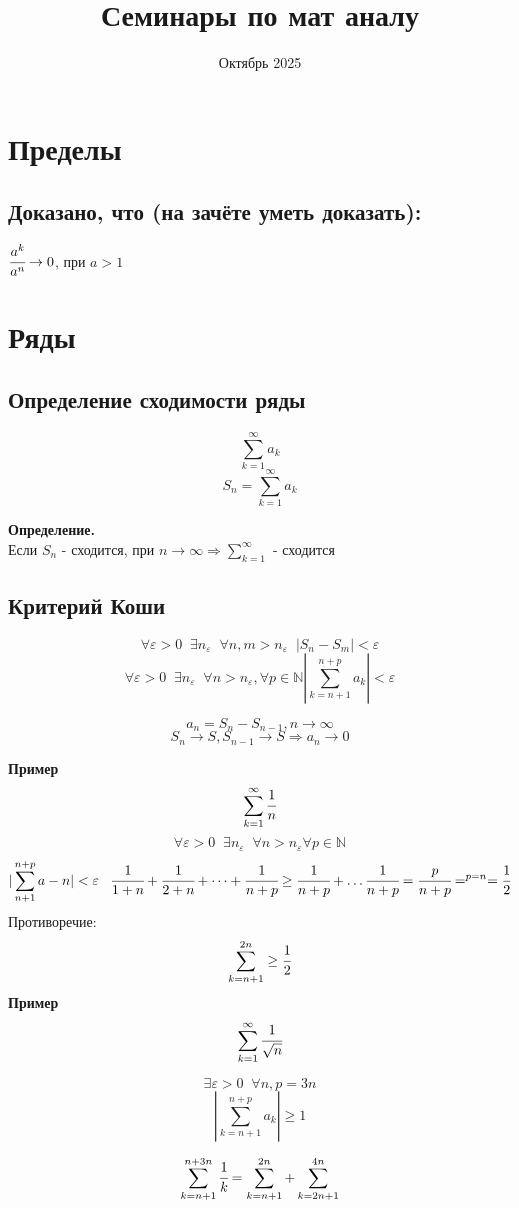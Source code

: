 \documentclass[12pt, paper]{article}
\title{Семинары по мат аналу}
\date{Октябрь 2025}
\newcommand{\N}{\mathbb{N}}
\begin{document}
\maketitle
\newpage
\section{Пределы}
\subsection{Доказано, что (на зачёте уметь доказать):}
$ \cfrac{a^k}{a^n} \to 0$, при $a > 1$
\section{Ряды}
\subsection{Определение сходимости ряды}
\[ \sum_{k=1}^\infty a_k\]
\[ S_n = \sum_{k=1}^\infty a_k\]

\begin{tcolorbox}
\textbf{Определение.} \\
Если $S_n$ - сходится, при $n \to \infty \Rightarrow  \sum_{k=1}^\infty $ - сходится 
\end{tcolorbox}

\subsection{Критерий Коши}
\begin{tcolorbox}
    \[ \forall \varepsilon > 0\;\; \exists n_\varepsilon\;\; \forall n,m > n_\varepsilon \;\; |S_n-S_m| < \varepsilon\]
    \[ \forall \varepsilon > 0\;\; \exists n_\varepsilon\;\; \forall n > n_\varepsilon,\forall p \in \N |\sum_{k=n+1}^{n+p} a_k|< \varepsilon \]    
\end{tcolorbox}


\[a_n = S_n - S_{n-1}, n\to \infty\]
\[ S_n \to S, S_{n-1} \to S \Rightarrow a_n \to 0\]

\textbf{Пример} 
\[\sum_{k=1}^\infty  \cfrac{1}{n}\]
\[ \forall \varepsilon > 0\;\; \exists n_\varepsilon\;\; \forall n > n_\varepsilon \forall p \in \N\]
\[ |\sum_{n+1}^{n+p} a-n| < \varepsilon\;\;\; \cfrac{1}{1+n} + \cfrac{1}{2+n} + \dots + \cfrac{1
}{n+p} \geq \cfrac{1}{n+p} + \dots \cfrac{1}{n+p} = \cfrac{p}{n+p} =^{p=n}= \cfrac{1}{2} \]
Противоречие:
\[\sum_{k=n+1}^{2n} \geq \cfrac{1}{2}\]
\textbf{Пример} 
\[\sum_{k=1}^\infty  \cfrac{1}{\sqrt{n}}\]
\begin{tcolorbox}
    \[ \exists \varepsilon > 0\;\;\forall n, p=3n \]
    \[ |\sum_{k=n+1}^{n+p}a_k| \geq 1 \]
\end{tcolorbox}
\[ \sum_{k=n+1}^{n+3n} \cfrac{1}{k} = \sum_{k=n+1}^{2n} + \sum_{k=2n+1}^{4n} \]
\end{document}
